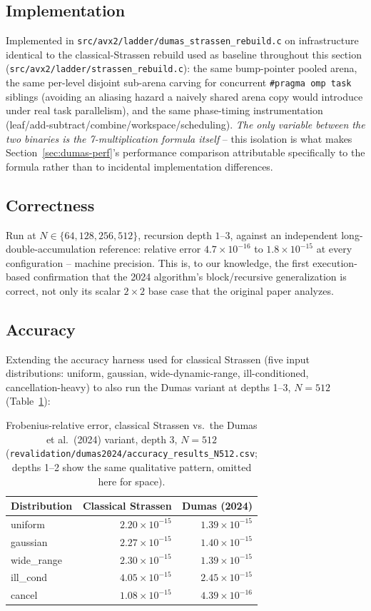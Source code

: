 \documentclass[acmsmall]{acmart}
\begin{document}
\subsection{Implementation}
Implemented in \texttt{src/avx2/ladder/dumas\_strassen\_rebuild.c} on
infrastructure identical to the classical-Strassen rebuild used as
baseline throughout this section (\texttt{src/avx2/ladder/strassen\_rebuild.c}): the
same bump-pointer pooled arena, the same per-level disjoint sub-arena
carving for concurrent \texttt{\#pragma omp task} siblings (avoiding an
aliasing hazard a naively shared arena copy would introduce under real
task parallelism), and the same phase-timing instrumentation
(leaf/add-subtract/combine/workspace/scheduling). \emph{The only
variable between the two binaries is the 7-multiplication formula
itself} -- this isolation is what makes
Section~\ref{sec:dumas-perf}'s performance comparison attributable
specifically to the formula rather than to incidental implementation
differences.

\subsection{Correctness}
\label{sec:dumas-correctness}
Run at $N \in \{64,128,256,512\}$, recursion depth $1$--$3$, against an
independent long-double-accumulation reference: relative error
$4.7\times10^{-16}$ to $1.8\times10^{-15}$ at every configuration --
machine precision. This is, to our knowledge, the first execution-based
confirmation that the 2024 algorithm's block/recursive generalization is
correct, not only its scalar $2\times2$ base case that the original
paper analyzes.

\subsection{Accuracy}
Extending the accuracy harness used for classical Strassen (five input
distributions: uniform, gaussian, wide-dynamic-range, ill-conditioned,
cancellation-heavy) to also run the Dumas variant at depths 1--3,
$N{=}512$ (Table~\ref{tab:dumas-accuracy}):

\begin{table}[h]
\centering
\small
\caption{Frobenius-relative error, classical Strassen vs.\ the Dumas
et al.\ (2024) variant, depth 3, $N{=}512$
(\texttt{revalidation/dumas2024/accuracy\_results\_N512.csv}; depths 1--2
show the same qualitative pattern, omitted here for space).}
\label{tab:dumas-accuracy}
\begin{tabular}{lrr}
\toprule
Distribution & Classical Strassen & Dumas (2024) \\
\midrule
uniform    & $2.20\times10^{-15}$ & $1.39\times10^{-15}$ \\
gaussian   & $2.27\times10^{-15}$ & $1.40\times10^{-15}$ \\
wide\_range & $2.30\times10^{-15}$ & $1.39\times10^{-15}$ \\
ill\_cond   & $4.05\times10^{-15}$ & $2.45\times10^{-15}$ \\
cancel     & $1.08\times10^{-15}$ & $4.39\times10^{-16}$ \\
\bottomrule
\end{tabular}
\end{table}
\end{document}
